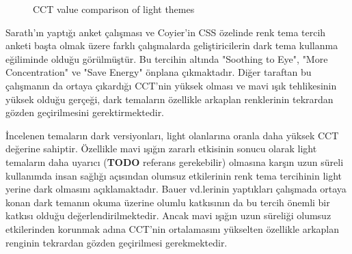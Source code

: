 \documentclass{article}
\begin{document}
\lighttable
\pgfplotstabletranspose[colnames from=themes]\tablelight{\lighttable}

\begin{figure}[htbp]
  \caption{CCT value comparison of light themes}
  \label{fig:light-compare}
\end{figure}

Sarath'ın yaptığı anket çalışması \cite{sarath2016prefer} ve Coyier'in CSS özelinde renk tema tercih anketi \cite{coyier2013poll} başta olmak üzere farklı çalışmalarda geliştiricilerin dark tema kullanma eğiliminde olduğu görülmüştür. Bu tercihin altında "Soothing to Eye", "More Concentration" ve "Save Energy" önplana çıkmaktadır. Diğer taraftan bu çalışmanın da ortaya çıkardığı CCT'nin yüksek olması ve mavi ışık tehlikesinin yüksek olduğu gerçeği, dark temaların özellikle arkaplan renklerinin tekrardan gözden geçirilmesini gerektirmektedir.

İncelenen temaların dark versiyonları, light olanlarına oranla daha yüksek CCT değerine sahiptir. Özellikle mavi ışığın zararlı etkisinin sonucu olarak light temaların daha uyarıcı (\textbf{TODO} referans gerekebilir) olmasına karşın uzun süreli kullanımda insan sağlığı açısından olumsuz etkilerinin renk tema tercihinin light yerine dark olmasını açıklamaktadır. Bauer vd.lerinin \cite{bauer1980improving} yaptıkları çalışmada ortaya konan dark temanın okuma üzerine olumlu katkısının da bu tercih önemli bir katkısı olduğu değerlendirilmektedir. Ancak mavi ışığın uzun süreliği olumsuz etkilerinden korunmak adına CCT'nin ortalamasını yükselten özellikle arkaplan renginin tekrardan gözden geçirilmesi gerekmektedir.
\end{document}
